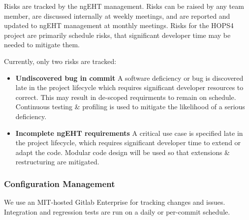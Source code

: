 Risks are tracked by the \ac{ngEHT} management. Risks can be raised by any team member, are discussed internally at weekly meetings, and are reported and updated to \ac{ngEHT} management at monthly meetings. Risks for the HOPS4 project are primarily schedule risks, \eg that significant developer time may be needed to mitigate them.

Currently, only two risks are tracked:

\begin{itemize}

\item \textbf{Undiscovered bug in commit} A software deficiency or bug is discovered late in the project lifecycle which requires significant developer resources to correct. This may result in de-scoped requirments to remain on schedule. Continuous testing \& profiling is used to mitigate the likelihood of a serious deficiency.

\item \textbf{Incomplete ngEHT requirements} A critical use case is specified late in the project lifecycle, which requires significant developer time to extend or adapt the code. Modular code design will be used so that extensions \& restructuring are mitigated. 

\end{itemize}


\subsubsection{Configuration Management}

We use an MIT-hosted Gitlab Enterprise for tracking changes and issues.  Integration and regression tests are run on a daily or per-commit schedule.


%
%
